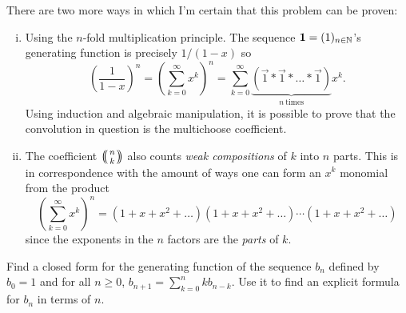 \documentclass[12pt]{memoir}
\begin{document}
There are two more ways in which I'm certain that this problem can be proven:
\begin{enumerate}[i)]
    \itemsep=-0.4em 
    \item Using the $n$-fold multiplication principle. The sequence $\mathbf{1}=(1)_{n\in\mathbb{N}}$'s generating function is precisely $1/(1-x)$ so 
    $$\left(\frac{1}{1-x}\right)^n=\left(\sum_{k=0}^\infty x^k\right)^n=\sum_{k=0}^\infty \underbrace{(\vec{1}\ast\vec{1}\ast\dots\ast\vec{1})}_{n\ \text{times}}x^k.$$
    Using induction and algebraic manipulation, it is possible to prove that the convolution in question is the multichoose coefficient.
    \item The coefficient $\multinom{n}{k}$ also counts \emph{weak compositions} of $k$ into $n$ parts. This is in correspondence with the amount of ways one can form an $x^k$ monomial from the product
    $$\left(\sum_{k=0}^\infty x^k\right)^n=(1+x+x^2+\dots)(1+x+x^2+\dots)\cdots(1+x+x^2+\dots)$$
    since the exponents in the $n$ factors are the \emph{parts} of $k$.
\end{enumerate}
\newpage
\begin{Ej}[Exercise 6]
    Find a closed form for the generating function of the sequence $b_n$ defined by $b_0=1$ and for all $n\geq 0$, $b_{n+1}=\sum_{k=0}^nkb_{n-k}$. Use it to find an explicit formula for $b_n$ in terms of $n$.
\end{Ej}
\end{document}
